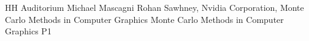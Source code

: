\tablePlenary{} %
{HH Auditorium}	%
{Michael Mascagni}		%
{Rohan Sawhney, Nvidia Corporation, Monte Carlo Methods in Computer Graphics}	%
{Monte Carlo Methods in Computer Graphics}		%
{P1}		%
\\\hline
